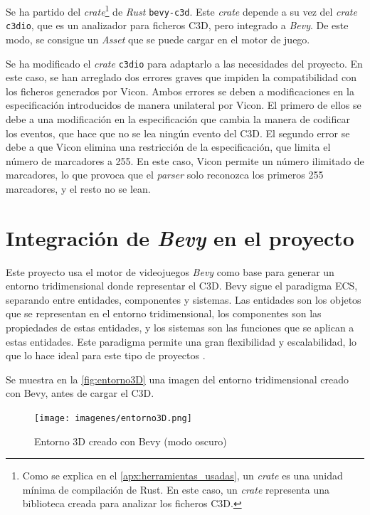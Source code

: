 Se ha partido del \textit{crate}\footnote{Como se explica en el \autoref{apx:herramientas_usadas}, un \textit{crate} es una unidad mínima de compilación de Rust. En este caso, un \textit{crate} representa una biblioteca creada para analizar los ficheros \ac{C3D}.} de \textit{Rust} \texttt{bevy-c3d}. Este \textit{crate} depende a su vez del \textit{crate} \texttt{c3dio}, que es un analizador para ficheros \ac{C3D}, pero integrado a \textit{Bevy}. De este modo, se consigue un \textit{Asset} que se puede cargar en el motor de juego.

Se ha modificado el \textit{crate} \texttt{c3dio} para adaptarlo a las necesidades del proyecto. En este caso, se han arreglado dos errores graves que impiden la compatibilidad con los ficheros generados por Vicon. Ambos errores se deben a modificaciones en la especificación introducidos de manera unilateral por Vicon. El primero de ellos se debe a una modificación en la especificación que cambia la manera de codificar los eventos, que hace que no se lea ningún evento del \ac{C3D}. El segundo error se debe a que Vicon elimina una restricción de la especificación, que limita el número de marcadores a 255. En este caso, Vicon permite un número ilimitado de marcadores, lo que provoca que el \textit{parser} solo reconozca los primeros 255 marcadores, y el resto no se lean.   

\section{Integración de \textit{Bevy} en el proyecto} \label{sec:bevy}

Este proyecto usa el motor de videojuegos \textit{Bevy} como base para generar un entorno tridimensional donde representar el \ac{C3D}. Bevy sigue el paradigma \ac{ECS}, separando entre entidades, componentes y sistemas. Las entidades son los objetos que se representan en el entorno tridimensional, los componentes son las propiedades de estas entidades, y los sistemas son las funciones que se aplican a estas entidades. Este paradigma permite una gran flexibilidad y escalabilidad, lo que lo hace ideal para este tipo de proyectos \autocite{prdevingDeepdivingEntityComponent2023}.

Se muestra en la \autoref{fig:entorno3D} una imagen del entorno tridimensional creado con Bevy, antes de cargar el \ac{C3D}.


\begin{figure}[H]
  \centering
  \texttt{[image: imagenes/entorno3D.png]}
  \caption{Entorno 3D creado con Bevy (modo oscuro)}
  \label{fig:entorno3D}
\end{figure}

